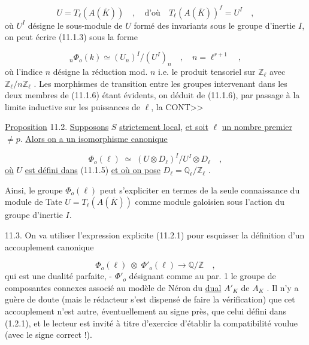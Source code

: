 \begin{equation}\tag{11.1.5}
U = T_{\ell}(A(\bar{K})) \quad , \quad \mbox{d'où} \quad T_{\ell}(A(\bar{K}))^{f} = U^{I} \quad ,
\end{equation}
où $U^{I}$ désigne le sous-module de $U$ formé des invariants sous le groupe d'inertie $I$, on peut écrire (11.1.3) sous la forme

\begin{equation}\tag{11.1.6}
{}_{n}\Phi_{o}(k) \simeq (U_{n})^{I}/(U^{I})_{n} \quad , \quad n = \ell^{r+1} \quad ,
\end{equation}
où l'indice $n$ désigne la réduction mod. $n$ i.e. le produit tensoriel sur $\mathbb{Z}_{\ell}$ avec $\mathbb{Z}_{\ell}/n\mathbb{Z}_{\ell}$ . Les morphismes de transition entre les groupes intervenant dans les deux membres de (11.1.6) étant évidents, on déduit de (11.1.6), par passage à la limite inductive sur les puissances de $\ell$, la CONT>>



\underline{Proposition} 11.2. \underline{Supposons} $S$ \underline{strictement local}, \underline{et soit} $\ell$ \underline{un nombre premier} $\neq p$. \underline{Alors on a un isomorphisme canonique}

\begin{equation}\tag{11.2.1}
\Phi_o(\ell) \;\simeq\; (U\otimes D_\ell)^I/U^I\otimes D_\ell \quad ,
\end{equation}
\underline{où} $U$ \underline{est défini dans} (11.1.5) \underline{et où on pose} $D_\ell = \mathbb{Q}_\ell/\mathbb{Z}_\ell$ .

Ainsi, le groupe $\Phi_o(\ell)$ peut s'expliciter en termes de la seule connaissance du module de Tate $U = T_\ell(A(\overline{K}))$ comme module galoisien sous l'action du groupe d'inertie $I$.

11.3. On va utiliser l'expression explicite (11.2.1) pour esquisser la définition d'un accouplement canonique

\begin{equation}\tag{11.3.1}
\Phi_o(\ell) \;\otimes\; \Phi'_o(\ell) \longrightarrow \mathbb{Q}/\mathbb{Z} \quad ,
\end{equation}
qui est une dualité parfaite, - $\Phi'_o$ désignant comme au par. 1 le groupe de composantes connexes associé au modèle de Néron du \underline{dual} $A'_K$ de $A_K$ . Il n'y a guère de doute (mais le rédacteur s'est dispensé de faire la vérification) que cet accouplement n'est autre, éventuellement au signe près, que celui défini dans (1.2.1), et le lecteur est invité à titre d'exercice d'établir la compatibilité voulue (avec le signe correct !).


